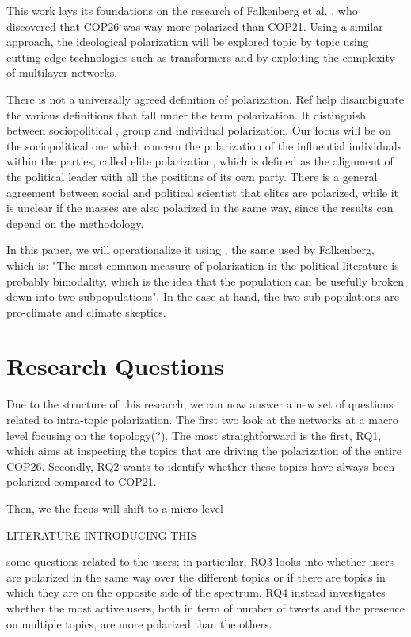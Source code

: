This work lays its foundations on the research of Falkenberg et al. \cite{falkenberg_growing_2022}, who discovered that COP26 was way more polarized than COP21. Using a similar approach, the ideological polarization will be explored topic by topic using cutting edge technologies such as transformers and by exploiting the complexity of multilayer networks. 

There is not a universally agreed definition of polarization. Ref \cite{madgalena_polarization} help disambiguate the various definitions that fall under the term polarization. It distinguish between sociopolitical , group and individual polarization. Our focus will be on the sociopolitical one which concern the polarization of the influential individuals within the parties,  called elite polarization, which is defined  as the alignment of the political leader with all the positions of its own party. There is a general agreement between social and political scientist that elites are polarized, while it is unclear  if the masses are also polarized in the same way, since the results can depend on the methodology.



In this paper, we will operationalize it using \cite{bramson_understanding_2017}, the same used by Falkenberg, which is: "The most common measure of polarization in the political literature is probably bimodality, which is the idea that the population can be usefully broken down into two subpopulations". 
In the case at hand, the two sub-populations are pro-climate and climate skeptics.



\section{Research Questions}
Due to the structure of this research, we can now answer a new set of questions related to intra-topic polarization. The first two look at the networks at a macro level focusing on the topology(?). The most straightforward is the first, RQ1, which aims at inspecting the topics that are driving the polarization of the entire COP26. Secondly, RQ2 wants to identify whether these topics have always been polarized compared to COP21.

Then, we the focus will shift to a micro level 

LITERATURE INTRODUCING THIS

some questions related to the users; in particular, RQ3 looks into whether  users are polarized in the same way over the different topics or if there are topics in which they are on the opposite side of the spectrum. RQ4 instead investigates whether the most active users, both in term of number of tweets and the presence on multiple topics, are more polarized than the others.




